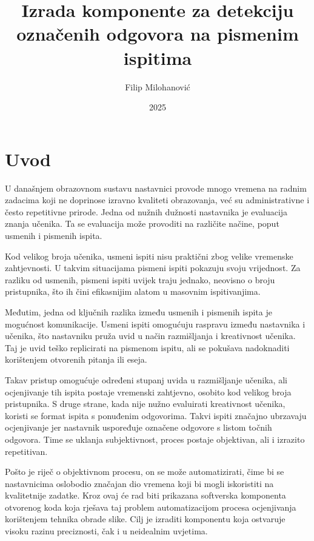 \documentclass{foi}
\title{Izrada komponente za detekciju označenih odgovora na pismenim ispitima}
\author{Filip Milohanović}
\date{2025}
\begin{document}
\maketitle

\tableofcontents

\pagestyle{plain}
\chapter{Uvod}

U današnjem obrazovnom sustavu nastavnici provode mnogo vremena na radnim zadacima koji ne doprinose izravno kvaliteti obrazovanja, već su administrativne i često repetitivne prirode. Jedna od nužnih dužnosti nastavnika je evaluacija znanja učenika. Ta se evaluacija može provoditi na različite načine, poput usmenih i pismenih ispita.

Kod velikog broja učenika, usmeni ispiti nisu praktični zbog velike vremenske zahtjevnosti. U takvim situacijama pismeni ispiti pokazuju svoju vrijednost. Za razliku od usmenih, pismeni ispiti uvijek traju jednako, neovisno o broju pristupnika, što ih čini efikasnijim alatom u masovnim ispitivanjima.

Međutim, jedna od ključnih razlika između usmenih i pismenih ispita je mogućnost komunikacije. Usmeni ispiti omogućuju raspravu između nastavnika i učenika, što nastavniku pruža uvid u način razmišljanja i kreativnost učenika. Taj je uvid teško replicirati na pismenom ispitu, ali se pokušava nadoknaditi korištenjem otvorenih pitanja ili eseja.

Takav pristup omogućuje određeni stupanj uvida u razmišljanje učenika, ali ocjenjivanje tih ispita postaje vremenski zahtjevno, osobito kod velikog broja pristupnika. S druge strane, kada nije nužno evaluirati kreativnost učenika, koristi se format ispita s ponuđenim odgovorima. Takvi ispiti značajno ubrzavaju ocjenjivanje jer nastavnik uspoređuje označene odgovore s listom točnih odgovora. Time se uklanja subjektivnost, proces postaje objektivan, ali i izrazito repetitivan.

Pošto je riječ o objektivnom procesu, on se može automatizirati, čime bi se nastavnicima oslobodio značajan dio vremena koji bi mogli iskoristiti na kvalitetnije zadatke. Kroz ovaj će rad biti prikazana softverska komponenta otvorenog koda koja rješava taj problem automatizacijom procesa ocjenjivanja korištenjem tehnika obrade slike. Cilj je izraditi komponentu koja ostvaruje visoku razinu preciznosti, čak i u neidealnim uvjetima.
\end{document}
